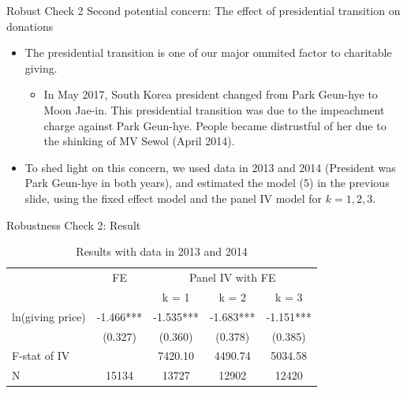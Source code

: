 \documentclass[
  ignorenonframetext,
]{beamer}
\providecommand{\tightlist}{%
  \setlength{\itemsep}{0pt}\setlength{\parskip}{0pt}}
\begin{document}
\begin{frame}{Robust Check 2}
\protect\hypertarget{robust-check-2}{}
Second potential concern: The effect of presidential transition on donations

\begin{itemize}
\tightlist
\item
  The presidential transition is one of our major ommited factor to charitable giving.

  \begin{itemize}
  \tightlist
  \item
    In May 2017, South Korea president changed from Park Geun-hye to Moon Jae-in. This presidential transition was due to the impeachment charge against Park Geun-hye. People became distrustful of her due to the shinking of MV Sewol (April 2014).
  \end{itemize}
\item
  To shed light on this concern, we used data in 2013 and 2014 (President was Park Geun-hye in both years), and estimated the model (5) in the previous slide, using the fixed effect model and the panel IV model for \(k = 1, 2, 3\).
\end{itemize}
\end{frame}

\begin{frame}{Robustness Check 2: Result}
\protect\hypertarget{robustness-check-2-result}{}
\begin{table}

\caption{\label{tab:kableShortEstimateElasticity}Results with data in 2013 and 2014}
\centering
\fontsize{9}{11}\selectfont
\begin{tabular}[t]{lcccc}
\toprule
\multicolumn{1}{c}{ } & \multicolumn{1}{c}{FE} & \multicolumn{3}{c}{Panel IV with FE} \\
\cmidrule(l{3pt}r{3pt}){2-2} \cmidrule(l{3pt}r{3pt}){3-5}
 &  & k = 1 & k = 2 & k = 3\\
\midrule
ln(giving price) & -1.466*** & -1.535*** & -1.683*** & -1.151***\\
 & (0.327) & (0.360) & (0.378) & (0.385)\\
F-stat of IV &  & 7420.10 & 4490.74 & 5034.58\\
N & 15134 & 13727 & 12902 & 12420\\
\bottomrule
\end{tabular}
\end{table}
\end{frame}
\end{document}
